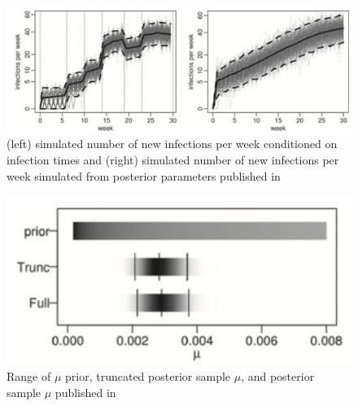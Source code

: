 \documentclass{uwstat572}
\begin{document}
\begin{figure}[H]
\centering
\includegraphics[height=0.36\linewidth, keepaspectratio]{figures/brown_figure_4.png}
\caption{(left) simulated number of new infections per week conditioned on infection times and (right) simulated number of new infections per week simulated from posterior parameters published in  \citet{Brown} }
\label{fig:post_sim_plot}
\end{figure} 

\begin{figure}[H]
\centering
\includegraphics[height=0.26\linewidth, keepaspectratio]{figures/brown_figure_2a.png}
\caption{Range of $\mu$ prior, truncated posterior sample $\mu$, and posterior sample $\mu$ published in \citet{Brown}}
\label{fig:prior_mu_plot}
\end{figure} 
\end{document}

